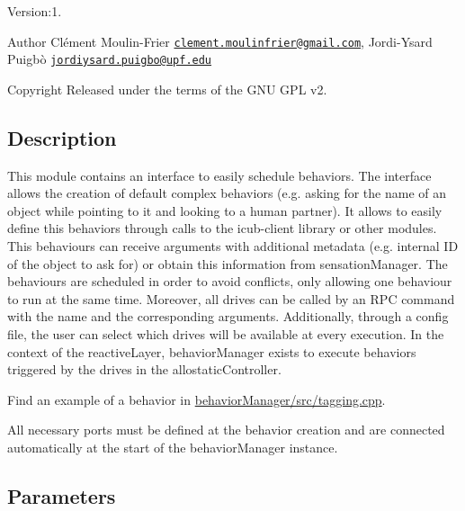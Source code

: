 Version\+:1. \begin{DoxyAuthor}{Author}
Clément Moulin-\/\+Frier \href{mailto:clement.moulinfrier@gmail.com}{\tt clement.\+moulinfrier@gmail.\+com}, Jordi-\/\+Ysard Puigbò \href{mailto:jordiysard.puigbo@upf.edu}{\tt jordiysard.\+puigbo@upf.\+edu} ~\newline
 
\end{DoxyAuthor}
\begin{DoxyCopyright}{Copyright}
Released under the terms of the G\+NU G\+PL v2. 
\end{DoxyCopyright}
\hypertarget{group__touchDetector_intro_sec}{}\subsection{Description}\label{group__touchDetector_intro_sec}
This module contains an interface to easily schedule behaviors. The interface allows the creation of default complex behaviors (e.\+g. asking for the name of an object while pointing to it and looking to a human partner). It allows to easily define this behaviors through calls to the icub-\/client library or other modules. This behaviours can receive arguments with additional metadata (e.\+g. internal ID of the object to ask for) or obtain this information from sensation\+Manager. The behaviours are scheduled in order to avoid conflicts, only allowing one behaviour to run at the same time. Moreover, all drives can be called by an R\+PC command with the name and the corresponding arguments. Additionally, through a config file, the user can select which drives will be available at every execution. In the context of the reactive\+Layer, behavior\+Manager exists to execute behaviors triggered by the drives in the allostatic\+Controller.
\begin{DoxyItemize}
\item Find an example of a behavior in \hyperlink{tagging_8cpp}{behavior\+Manager/src/tagging.\+cpp}.

All necessary ports must be defined at the behavior creation and are connected automatically at the start of the behavior\+Manager instance.
\end{DoxyItemize}\hypertarget{group__touchDetector_parameters_sec}{}\subsection{Parameters}\label{group__touchDetector_parameters_sec}


